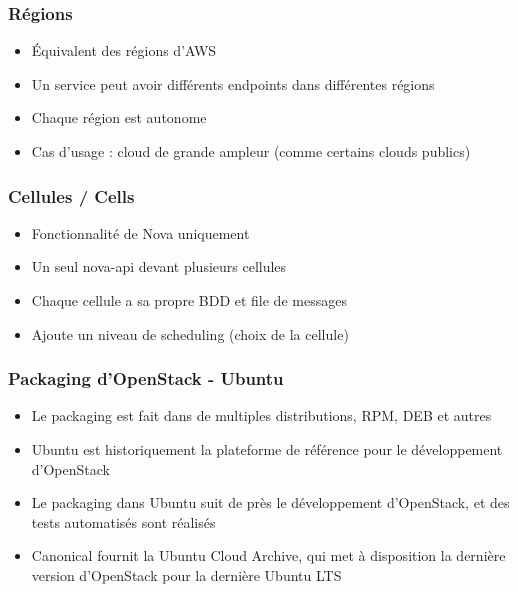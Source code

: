   \begin{frame}
    \frametitle{Régions}
    \begin{itemize}
      \item Équivalent des régions d'AWS
      \item Un service peut avoir différents endpoints dans différentes régions
      \item Chaque région est autonome
      \item Cas d'usage : cloud de grande ampleur (comme certains clouds publics)
    \end{itemize}
  \end{frame}

  \begin{frame}
    \frametitle{Cellules / Cells}
    \begin{itemize}
      \item Fonctionnalité de Nova uniquement
      \item Un seul nova-api devant plusieurs cellules
      \item Chaque cellule a sa propre BDD et file de messages
      \item Ajoute un niveau de scheduling (choix de la cellule)
    \end{itemize}
  \end{frame}

  \begin{frame}
    \frametitle{Packaging d'OpenStack - Ubuntu}
    \begin{itemize}
      \item Le packaging est fait dans de multiples distributions, RPM, DEB et autres\pause
      \item Ubuntu est historiquement la plateforme de référence pour le développement d'OpenStack
      \item Le packaging dans Ubuntu suit de près le développement d'OpenStack, et des tests automatisés sont réalisés
      \item Canonical fournit la Ubuntu Cloud Archive, qui met à disposition la dernière version d'OpenStack pour la dernière Ubuntu LTS
    \end{itemize}
  \end{frame}

